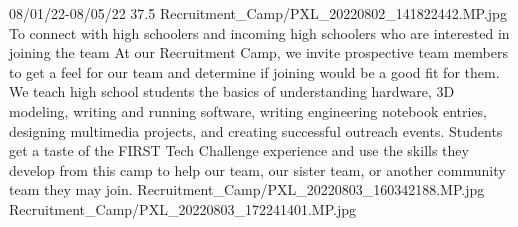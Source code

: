 {08/01/22-08/05/22}
{37.5}
{Recruitment_Camp/PXL_20220802_141822442.MP.jpg}
{To connect with high schoolers and incoming high schoolers who are interested in joining the team}
{At our Recruitment Camp, we invite prospective team members to get a feel for our team and determine if joining would be a good fit for them. We teach high school students the basics of understanding hardware, 3D modeling, writing and running software, writing engineering notebook entries, designing multimedia projects, and creating successful outreach events. Students get a taste of the FIRST Tech Challenge experience and use the skills they develop from this camp to help our team, our sister team, or another community team they may join.
} 
{Recruitment_Camp/PXL_20220803_160342188.MP.jpg}
{Recruitment_Camp/PXL_20220803_172241401.MP.jpg}